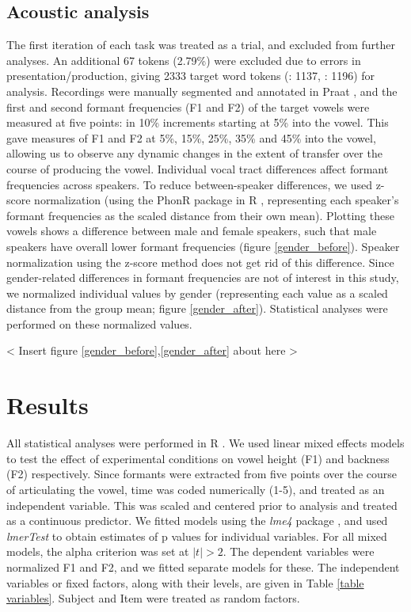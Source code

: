 \documentclass[12 pt]{article}
\newcommand{\nt}[1]{\textipa{[#1]}} %
\begin{document}
\subsection{Acoustic analysis}\label{analysis}
The first iteration of each task was treated as a trial, and excluded from further analyses. An additional 67 tokens (2.79\%) were excluded due to errors in presentation/production, giving 2333 target word tokens (\nt{2}: 1137, \nt{\ae}: 1196) for analysis. Recordings were manually segmented and annotated in Praat \citep{boersma2016praat}, and the first and second formant frequencies (F1 and F2) of the target vowels \nt{2, \ae} were measured at five points: in 10\% increments starting at 5\% into the vowel. This gave measures of F1 and F2 at 5\%, 15\%, 25\%, 35\% and 45\% into the vowel, allowing us to observe any dynamic changes in the extent of transfer over the course of producing the vowel. Individual vocal tract differences affect formant frequencies across speakers. To reduce between-speaker differences, we used z-score normalization (using the PhonR package \citep{phonR} in R \citep{r}, representing each speaker's formant frequencies as the scaled distance from their own mean). Plotting these vowels shows a difference between male and female speakers, such that male speakers have overall lower formant frequencies (figure \ref{gender_before}). Speaker normalization using the z-score method does not get rid of this difference. Since gender-related differences in formant frequencies are not of interest in this study, we normalized individual values by gender (representing each value as a scaled distance from the group mean; figure \ref{gender_after}). Statistical analyses were performed on these normalized values. 

< Insert figure \ref{gender_before},\ref{gender_after} about here >

\section{Results} \label{results}

All statistical analyses were performed in R \citep{r}. We used linear mixed effects models to test the effect of experimental conditions on vowel height (F1) and backness (F2) respectively. Since formants were extracted from five points over the course of articulating the vowel, time was coded numerically (1-5), and treated as an independent variable. This was scaled and centered prior to analysis and treated as a continuous predictor. We fitted models using the \emph{lme4} package \citep{lme4}, and used \emph{lmerTest} \citep{lmerTest} to obtain estimates of p values for individual variables. For all mixed models, the alpha criterion was set at $|t| > 2 $. The dependent variables were normalized F1 and F2, and we fitted separate models for these. The independent variables or fixed factors, along with their levels, are given in Table \ref{table variables}. Subject and Item were treated as random factors.\\
\end{document}
